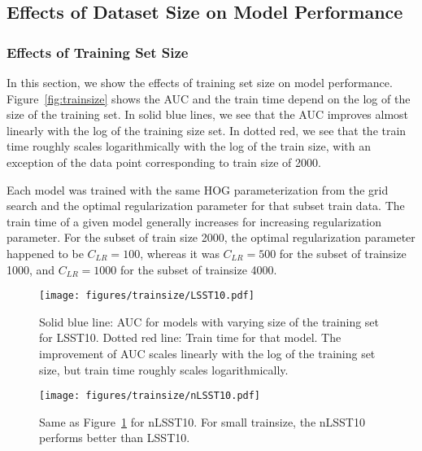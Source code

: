 \documentclass{emulateapj}
\begin{document}
\subsection{Effects of Dataset Size on Model Performance}\label{sec:datasize}
\subsubsection{Effects of Training Set Size}\label{sec:trainsetsize}
In this section, we show the effects of training set size on model
performance.  Figure~\ref{fig:trainsize} shows the AUC and the train
time depend on the log of the size of the training set.  In solid blue
lines, we see that the AUC improves almost linearly with the log of
the training size set.  In dotted red, we see that the train time
roughly scales logarithmically with the log of the train size, with an
exception of the data point corresponding to train size of 2000.

Each model was trained with the same HOG parameterization from the
grid search and the optimal regularization parameter for that subset
train data.  The train time of a given model generally increases for
increasing regularization parameter.  For the subset of train size
2000, the optimal regularization parameter happened to be
$C_{LR}=100$, whereas it was $C_{LR}=500$ for the subset of trainsize
1000, and $C_{LR}=1000$ for the subset of trainsize 4000.

\begin{figure}[t]\label{fig:trainsizeLSST10}
\begin{center}
\texttt{[image: figures/trainsize/LSST10.pdf]}
\caption{Solid blue line: AUC for models with varying size of the
  training set for LSST10.  Dotted red line: Train time for that
  model.  The improvement of AUC scales linearly with the log of the
  training set size, but train time roughly scales logarithmically.}
\end{center}
\end{figure}
\begin{figure}[t]\label{fig:trainsizenLSST10}
\begin{center}
\texttt{[image: figures/trainsize/nLSST10.pdf]}
\caption{Same as Figure~\ref{fig:trainsizeLSST10} for nLSST10.  For
  small trainsize, the nLSST10 performs better than LSST10. }
\end{center}
\end{figure}
\end{document}
